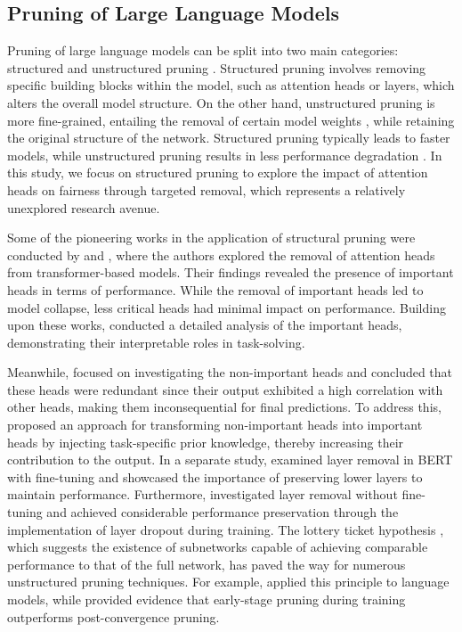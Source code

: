 \documentclass[letterpaper]{article} %
\newcommand{\goncalo}[1]
{\textcolor{orange}{{\bf}{\em #1}{\bf}}}
\begin{document}
\subsection{Pruning of Large Language Models}
Pruning of large language models can be split into two main categories: structured and unstructured pruning \cite{behnke2021pruning}. Structured pruning involves removing specific building blocks within the model, such as attention heads or layers, which alters the overall model structure. On the other hand, unstructured pruning is more fine-grained, entailing the removal of certain model weights  \cite{narang2017exploring,h.2018to}, while retaining the original structure of the network. Structured pruning typically leads to faster models, while unstructured pruning results in less performance degradation \cite{behnke2021pruning}. In this study, we focus on structured pruning to explore the impact of attention heads on fairness through targeted removal, which represents a relatively unexplored research avenue.

Some of the pioneering works in the application of structural pruning were conducted by \citet{voita-etal-2019-analyzing} and \citet{NEURIPS2019_2c601ad9}, where the authors explored the removal of attention heads from transformer-based models. Their findings revealed the presence of important heads in terms of performance. While the removal of important heads led to model collapse, less critical heads had minimal impact on performance. Building upon these works, \citet{he-choi-2021-stem} conducted a detailed analysis of the important heads, demonstrating their interpretable roles in task-solving.

Meanwhile, \citet{bian-etal-2021-attention} focused on investigating the non-important heads and concluded that these heads were redundant since their output exhibited a high correlation with other heads, making them inconsequential for final predictions. To address this, \citet{zhang-etal-2021-enlivening} proposed an approach for transforming non-important heads into important heads by injecting task-specific prior knowledge, thereby increasing their contribution to the output. In a separate study, \citet{sajjad2023effect} examined layer removal in BERT  \cite{devlin2018bert} with fine-tuning and showcased the importance of preserving lower layers to maintain performance. Furthermore, \citet{Fan2020Reducing} investigated layer removal without fine-tuning and achieved considerable performance preservation through the implementation of layer dropout during training. The lottery ticket hypothesis \cite{frankle2018the}, which suggests the existence of subnetworks capable of achieving comparable performance to that of the full network, has paved the way for numerous unstructured pruning techniques. For example, \citet{behnke-heafield-2020-losing} applied this principle to language models, while \citet{prasanna-etal-2020-bert} provided evidence that early-stage pruning during training outperforms post-convergence pruning.
\end{document}
